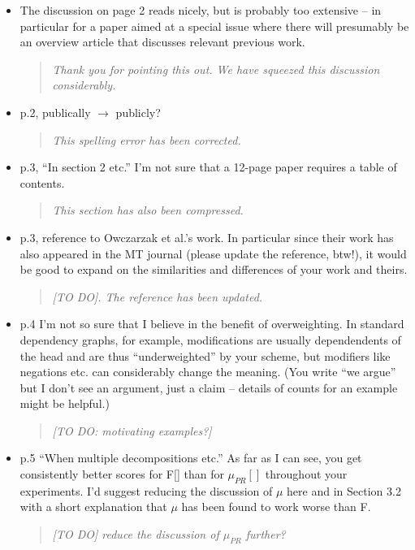 \documentclass[letterpaper,12pt]{article}
\newenvironment{response}
{\begin{quotation} \it}
  {\end{quotation}}
\begin{document}
\begin{itemize}
\item The discussion on page 2 reads nicely, but is probably too
  extensive -- in particular for a paper aimed at a special issue
  where there will presumably be an overview article that discusses
  relevant previous work.
  \begin{response}
    Thank you for pointing this out. We have squeezed this discussion
    considerably.
  \end{response}

\item  p.2, publically $\to$ publicly?
  \begin{response}
    This spelling error has been corrected.
  \end{response}

\item  p.3, ``In section 2 etc.'' I'm not sure that a 12-page paper
  requires a table of contents.
  \begin{response}
    This section has also been compressed.
  \end{response}

\item  p.3, reference to Owczarzak et al.'s work. In particular since
  their work has also appeared in the MT journal (please update the
  reference, btw!), it would be good to expand on the similarities and
  differences of your work and theirs.
  \begin{response}
    [TO DO].  The reference has been updated.
  \end{response}

\item p.4 I'm not so sure that I believe in the benefit of overweighting.
  In standard dependency graphs, for example, modifications are
  usually dependendents of the head and are thus ``underweighted'' by
  your scheme, but modifiers like negations etc. can considerably
  change the meaning.  (You write ``we argue'' but I don't see an
  argument, just a claim -- details of counts for an example might be
  helpful.)
  \begin{response}
    [TO DO: motivating examples?]
  \end{response}

\item p.5 ``When multiple decompositions etc.'' As far as I can see, you
  get consistently better scores for F[] than for $\mu_{PR}[]$
  throughout your experiments.  I'd suggest reducing the discussion of
  $\mu$ here and in Section 3.2 with a short explanation that $\mu$
  has been found to work worse than F.
  \begin{response}
    [TO DO] reduce the discussion of $\mu_{PR}$ further?
  \end{response}


\end{itemize}
\end{document}
